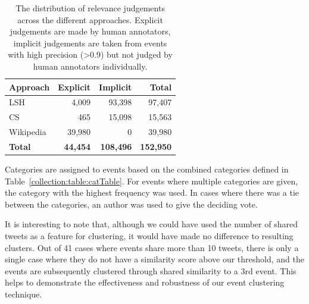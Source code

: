 \begin{table}[h!]
	\centering
	\caption[Distribution of relevance judgements across the different approaches.]{The distribution of relevance judgements across the different approaches. Explicit judgements are made by human annotators, implicit judgements are taken from events with high precision (\textgreater 0.9) but not judged by human annotators individually.}
	\label{table:eventsByTweets}

	\begin{tabulary}{\textwidth}{l r r r}
	\toprule
	\textbf{Approach} & \textbf{Explicit} & \textbf{Implicit} & \textbf{Total} \\
	\midrule
	LSH 		& 4,009 	& 93,398 	&  97,407 \\
	CS 			& 465 		& 15,098 	&  15,563 \\
	Wikipedia 	& 39,980 	& 0 		&  39,980  \\
	\midrule
	\textbf{Total} 	& \textbf{44,454} & \textbf{108,496} & \textbf{152,950}\\
	\bottomrule
	\end{tabulary}

\end{table}


Categories are assigned to events based on the combined categories defined in Table~\ref{collection:table:catTable}.
For events where multiple categories are given, the category with the highest frequency was used.
In cases where there was a tie between the categories, an author was used to give the deciding vote.

It is interesting to note that, although we could have used the number of shared tweets as a feature for clustering, it would have made no difference to resulting clusters.
Out of 41 cases where events share more than 10 tweets, there is only a single case where they do not have a similarity score above our threshold, and the events are subsequently clustered through shared similarity to a 3rd event.
This helps to demonstrate the effectiveness and robustness of our event clustering technique.